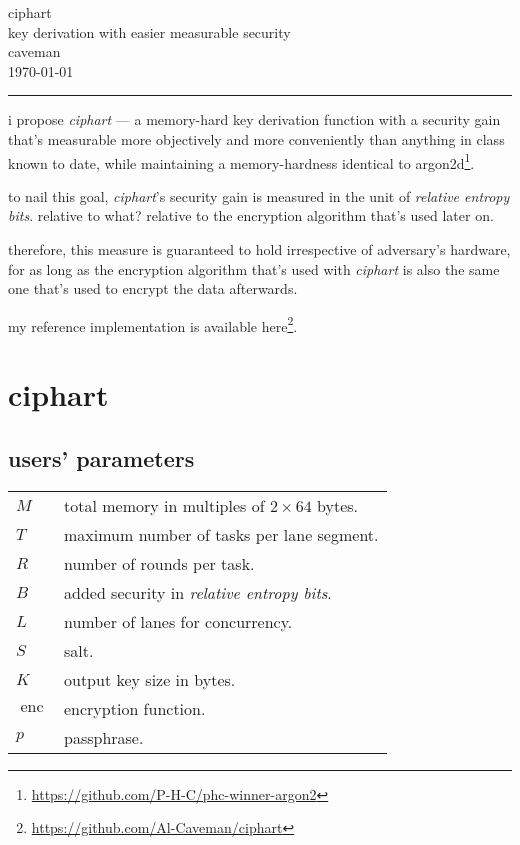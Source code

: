 \documentclass[twocolumn]{article}
\DeclareMathOperator{\enc}{enc}
\begin{document}

\begin{center}
\Huge
\noindent\xrfill[.5ex]{2pt}ciphart\xrfill[.5ex]{2pt}\\
\LARGE
key derivation with easier measurable security\\
\normalsize
caveman\\
\today\\
\rule{1\columnwidth}{2pt}
\end{center}

i propose \emph{ciphart} --- a memory-hard key derivation function with a
security gain that's measurable more objectively and more conveniently than
anything in class known to date, while maintaining a memory-hardness
identical to
argon2d\footnote{\url{https://github.com/P-H-C/phc-winner-argon2}}.

to nail this goal, \emph{ciphart}'s security gain is measured in the unit
of \emph{relative entropy bits}.  relative to what?  relative to the
encryption algorithm that's used later on.

therefore, this measure is guaranteed to hold irrespective of adversary's
hardware, for as long as the encryption algorithm that's used with
\emph{ciphart} is also the same one that's used to encrypt the data
afterwards.

my reference implementation is available
here\footnote{\url{https://github.com/Al-Caveman/ciphart}}.

\section{ciphart}
\subsection{users' parameters}
\begin{tabular}{ll}
    $M$ & total memory in multiples of $2 \times 64$ bytes.\\
    $T$ & maximum number of tasks per lane segment.\\
    $R$ & number of rounds per task.\\
    $B$ & added security in \emph{relative entropy bits}.\\
    $L$ & number of lanes for concurrency.\\
    $S$ & salt.\\
    $K$ & output key size in bytes.\\
    $\enc$ & encryption function.\\
    $p$ & passphrase.\\
\end{tabular}
\end{document}

